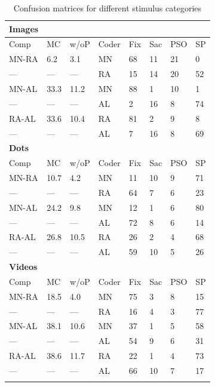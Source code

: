 \begin{table}
	\caption{Confusion matrices for different stimulus categories}
	\label{tab:mclf}       %
	\begin{tabular}{llllllll}
		\textbf{Images}&&&&&&&\\
		\hline\noalign{\smallskip}
		Comp & MC & w/oP & Coder & Fix & Sac & PSO & SP \\
		\noalign{\smallskip}\hline\noalign{\smallskip}
		MN-RA & 6.2 & 3.1 & MN & 68 & 11 & 21 & 0  \\
		--- & --- & --- & RA & 15 & 14 & 20 & 52 \\
		MN-AL & 33.3 & 11.2 & MN & 88 & 1 & 10 & 1 \\
		--- & --- & --- & AL & 2 &  16 & 8 & 74 \\
		RA-AL & 33.6 & 10.4 & RA & 81 & 2 & 9 & 8 \\
		---& ---& ---& AL & 7 & 16 & 8 & 69 \\
		\noalign{\smallskip}
		\textbf{Dots}&&&&&&&\\
		\hline\noalign{\smallskip}
		Comp & MC & w/oP & Coder & Fix & Sac & PSO & SP \\
		\noalign{\smallskip}\hline\noalign{\smallskip}
		MN-RA & 10.7 & 4.2 & MN & 11 & 10 & 9 & 71  \\
		--- & --- & --- & RA & 64 & 7 & 6 & 23 \\
		MN-AL & 24.2 & 9.8 & MN & 12 & 1 & 6 & 80 \\
		--- & --- & --- & AL & 72 & 8 & 6 & 14\\
		RA-AL & 26.8 & 10.5 & RA & 26 & 2 & 4 & 68 \\
		---& ---& ---& AL & 59 & 10 & 5 & 26 \\
		\noalign{\smallskip}
		\textbf{Videos}&&&&&&&\\
		\hline\noalign{\smallskip}
		Comp & MC & w/oP & Coder & Fix & Sac & PSO & SP \\
		\noalign{\smallskip}\hline\noalign{\smallskip}
		MN-RA & 18.5 & 4.0 & MN & 75 & 3 & 8 & 15 \\
		--- & --- & --- & RA & 16 & 4 & 3 & 77 \\
		MN-AL & 38.1 & 10.6 & MN & 37 & 1 & 5 & 58 \\
		--- & --- & --- & AL & 54 & 9 & 6 & 31\\
		RA-AL & 38.6 & 11.7 & RA & 22 & 1 & 4 & 73 \\
		---& ---& ---& AL & 66 & 10 & 7 & 17 \\
		\noalign{\smallskip}\hline
	\end{tabular}
\end{table}

